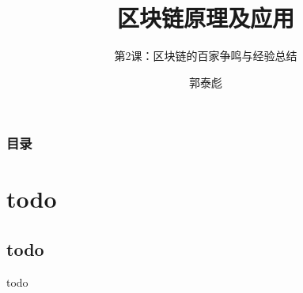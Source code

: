\documentclass[11pt]{beamer}
\begin{document}
	\author{郭泰彪}
	\title{区块链原理及应用}
	\subtitle{第2课：区块链的百家争鸣与经验总结}
	 
	 	\begin{frame}[plain]
	 	\maketitle
	 \end{frame}
	 
	 \begin{frame}
	 	\frametitle{目录}
	 	\tableofcontents[sectionstyle=show,subsectionstyle=show/shaded]
	 \end{frame}
	 
	 \section{todo}
	 \subsection{todo}
	 \begin{frame}
	 	todo
	 \end{frame}
\end{document}
